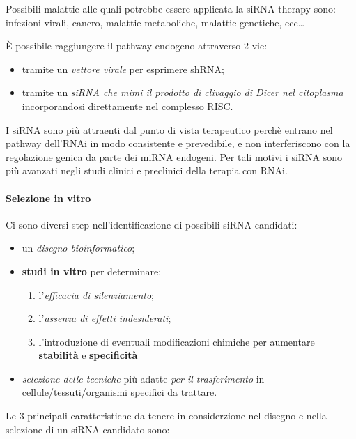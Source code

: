 \documentclass[]{article}
\begin{document}
Possibili malattie alle quali potrebbe essere applicata la siRNA therapy
sono: infezioni virali, cancro, malattie metaboliche, malattie
genetiche, ecc\ldots{}

È possibile raggiungere il pathway endogeno attraverso 2 vie:

\begin{itemize}
\itemsep1pt\parskip0pt
\item
  tramite un \emph{vettore virale} per esprimere shRNA;
\item
  tramite un \emph{siRNA che mimi il prodotto di clivaggio di Dicer nel
  citoplasma} incorporandosi direttamente nel complesso RISC.
\end{itemize}

I siRNA sono più attraenti dal punto di vista terapeutico perchè entrano
nel pathway dell'RNAi in modo consistente e prevedibile, e non
interferiscono con la regolazione genica da parte dei miRNA endogeni.
Per tali motivi i siRNA sono più avanzati negli studi clinici e
preclinici della terapia con RNAi.

\paragraph{Selezione in vitro}\label{selezione-in-vitro}

Ci sono diversi step nell'identificazione di possibili siRNA candidati:

\begin{itemize}
\itemsep1pt\parskip0pt
\item
  un \emph{disegno bioinformatico};
\item
  \textbf{studi in vitro} per determinare:

  \begin{enumerate}
  \def\labelenumi{\arabic{enumi}.}
  \itemsep1pt\parskip0pt
  \item
    l'\emph{efficacia di silenziamento};
  \item
    l'\emph{assenza di effetti indesiderati};
  \item
    l'introduzione di eventuali modificazioni chimiche per aumentare
    \textbf{stabilità} e \textbf{specificità}
  \end{enumerate}
\item
  \emph{selezione delle tecniche} più adatte \emph{per il trasferimento}
  in cellule/tessuti/organismi specifici da trattare.
\end{itemize}

Le 3 principali caratteristiche da tenere in considerzione nel disegno e
nella selezione di un siRNA candidato sono:
\end{document}
